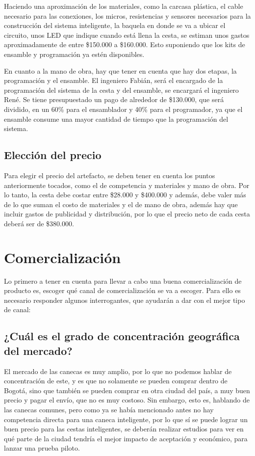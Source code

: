 \documentclass{report}
\begin{document}
    Haciendo una aproximación de los materiales, como la carcasa plástica, el cable necesario para las conexiones, los micros, resistencias y sensores necesarios para la construcción del sistema inteligente, la baquela en donde se va a ubicar el circuito, unos LED que indique cuando está llena la cesta, se estiman unos gastos aproximadamente de entre \$150.000 a \$160.000. Esto suponiendo que los kits de ensamble y programación ya estén disponibles.

    En cuanto a la mano de obra, hay que tener en cuenta que hay dos etapas, la programación y el ensamble. El ingeniero Fabián, será el encargado de la programación del sistema de la cesta y del ensamble, se encargará el ingeniero René. Se tiene presupuestado un pago de alrededor de \$130.000, que será dividido, en un 60\% para el ensamblador y 40\% para el programador, ya que el ensamble consume una mayor cantidad de tiempo que la programación del sistema.

    \section{Elección del precio}
    Para elegir el precio del artefacto, se deben tener en cuenta los puntos anteriormente tocados, como el de competencia y materiales y mano de obra. Por lo tanto, la cesta debe costar entre \$28.000 y \$400.000 y además, debe valer más de lo que suman el costo de materiales y el de mano de obra, además hay que incluir gastos de publicidad y distribución, por lo que el precio neto de cada cesta deberá ser de \$380.000.

\chapter{Comercialización}
    Lo primero a tener en cuenta para llevar a cabo una buena comercialización de producto es, escoger qué canal de comercialización se va a escoger. Para ello es necesario responder algunos interrogantes, que ayudarán a dar con el mejor tipo de canal:

    \section{¿Cuál es el grado de concentración geográfica del mercado?}
    El mercado de las canecas es muy amplio, por lo que no podemos hablar de concentración de este, y es que no solamente se pueden comprar dentro de Bogotá, sino que también se pueden comprar en otra ciudad del país, a muy buen precio y pagar el envío, que no es muy costoso. Sin embargo, esto es, hablando de las canecas comunes, pero como ya se había mencionado antes no hay competencia directa para una caneca inteligente, por lo que sí se puede lograr un buen precio para las cestas inteligentes, se deberán realizar estudios para ver en qué parte de la ciudad tendría el mejor impacto de aceptación y económico, para lanzar una prueba piloto.
\end{document}
